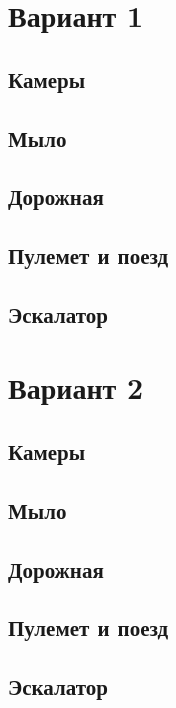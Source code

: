 
\usepackage{libertine}

\gradetrue
\newcommand{\flash}[5]{\draw[#4] (#1-0.01*#3, #2)node[below]{\scriptsize{$#5$}} -- +(0, 1.2*#3) -- +(-0.3*#3, 1.5*#3) arc (-20:-340:0.07*#3 and 0.03*#3) -- (#1+0.01*#3, #2 + 1.2*#3) -- (#1+0.01*#3, #2) arc (0:-180:0.01*#3 and 0.007*#3);}

\section*{Вариант 1}\firsttrue\secondfalse
\subsection{Камеры}

\clearpage
\subsection{Мыло}

\clearpage
\subsection{Дорожная}

\clearpage
\subsection{Пулемет и поезд}

\clearpage
\subsection{Эскалатор}

\clearpage
\section*{Вариант 2}\firstfalse\secondtrue
\subsection{Камеры}

\clearpage
\subsection{Мыло}

\clearpage
\subsection{Дорожная}

\clearpage
\subsection{Пулемет и поезд}

\clearpage
\subsection{Эскалатор}

\clearpage

